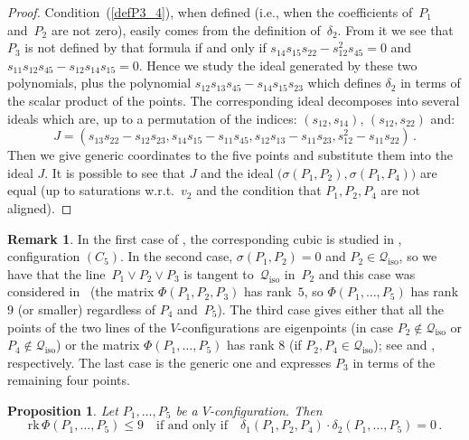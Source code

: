 \documentclass[a4paper, 11pt, reqno]{amsart}
\theoremstyle{plain}
\newtheorem{prop}[lemma]{Proposition}
\theoremstyle{definition}
\newtheorem{rmk}[lemma]{Remark}
\newcommand{\rk}{\ensuremath{\mathrm{rk}}}
\newcommand{\iso}{\mathcal{Q}_{\mathrm{iso}}}
\begin{document}
\begin{proof}
Condition~(\ref{defP3_4}), when defined (i.e., when the coefficients of~$P_1$ and~$P_2$ are not zero), easily comes from the definition of~$\delta_2$.
From it we see that $P_3$ is not defined by that formula if and only if
$s_{14}s_{15}s_{22}-s_{12}^2s_{45}=0$ and $s_{11}s_{12}s_{45}-s_{12}s_{14}s_{15}=0$.
Hence we study the ideal generated by these two polynomials, plus the
polynomial $s_{12}s_{13}s_{45}-s_{14}s_{15} s_{23}$ which defines
$\delta_2$ in terms of the scalar product of the points. The corresponding
ideal decomposes into several ideals which are, up to a permutation of
the indices: $(s_{12}, s_{14})$, $(s_{12}, s_{22})$ and:
%
\[
  J = (s_{13}s_{22} - s_{12}s_{23}, s_{14}s_{15} - s_{11}s_{45}, s_{12}s_{13} -
  s_{11}s_{23}, s_{12}^2 - s_{11}s_{22}) \,.
\]
%
Then we give generic coordinates to the five
points and substitute them into the ideal $J$. It is possible to see that
$J$ and the ideal $\bigl(\sigma(P_1, P_2), \sigma(P_1, P_4)\bigr)$ are equal (up to
saturations w.r.t.\ $v_2$ and the condition that $P_1, P_2, P_4$ are not
aligned).
\end{proof}
%
\begin{rmk}
In the first case of , the corresponding cubic
is studied in , configuration $(C_5)$.
In the second case, $\sigma(P_1, P_2) = 0$ and $P_2\in \iso$, so
we have that the line~$P_1 \vee P_2 \vee P_3$ is tangent to~$\iso$ in~$P_2$
and this case was considered in~
(the matrix $\Phi(P_1, P_2, P_3)$ has rank~$5$, so
$\Phi(P_1, \dots, P_5)$ has rank $9$ (or smaller) regardless of
$P_4$ and~$P_5$).
The third case gives either that all the
points of the two lines of the $V$-configurations are eigenpoints (in case
$P_2 \not\in \iso$ or $P_4 \not\in \iso$) or the matrix $\Phi(P_1, \dots, P_5)$
has rank $8$ (if $P_2, P_4 \in \iso$); see  and , respectively.
The last case is the generic one and expresses $P_3$ in terms of the remaining four points.
\end{rmk}
%
\begin{prop}
\label{prop:d1d2}
Let $P_1, \dots, P_5$ be a $V$-configuration. Then
%
\[
  \rk \,\Phi(P_1, \dots, P_5) \leq 9
  \quad \mbox{if and only if} \quad
  \delta_1(P_1, P_2, P_4) \cdot \delta_2(P_1, \dots, P_5) = 0 \,.
\]
%
\end{prop}
\end{document}
